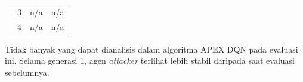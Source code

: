 \begin{table}[H]
\begin{tabular}{|c|c|c|c|}
    & 3                                                                            & n/a                                                                              & n/a                                                                              \\ \cline{2-4} 
    & 4                                                                            & n/a                                                                              & n/a                                                                              \\ \hline
  \end{tabular}
\end{table}

Tidak banyak yang dapat dianalisis dalam algoritma APEX DQN pada evaluasi ini.
Selama generasi 1, agen \emph{attacker} terlihat lebih stabil daripada saat evaluasi sebelumnya.

